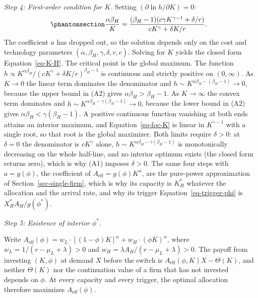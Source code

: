 \documentclass[
  11pt,
  letterpaper,
]{scrartcl}
\begin{document}
\emph{Step 4: First-order condition for \(K\).} Setting
\((\partial \ln h / \partial K) = 0\):
\begin{equation}\protect\phantomsection\label{eq-foc-K}{
\frac{\alpha \beta_H}{K} = \frac{(\beta_H - 1)(c\gamma K^{\gamma - 1} + \delta / r)}{cK^\gamma + \delta K / r}.
}\end{equation} The coefficient \(a\) has dropped out, so the solution
depends only on the cost and technology parameters
\((\alpha, \beta_H, \gamma, \delta, r, c)\). Solving for \(K\) yields
the closed form Equation~\ref{eq-K-H}. The critical point is the global
maximum. The function
\(h \propto K^{\alpha\beta_H} / (cK^\gamma + \delta K/r)^{\beta_H - 1}\)
is continuous and strictly positive on \((0, \infty)\). As \(K \to 0\)
the linear term dominates the denominator and
\(h \sim K^{\alpha\beta_H - (\beta_H - 1)} \to 0\), because the upper
bound in (A2) gives \(\alpha\beta_H > \beta_H - 1\). As \(K \to \infty\)
the convex term dominates and
\(h \sim K^{\alpha\beta_H - \gamma(\beta_H - 1)} \to 0\), because the
lower bound in (A2) gives \(\alpha\beta_H < \gamma(\beta_H - 1)\). A
positive continuous function vanishing at both ends attains an interior
maximum, and Equation~\ref{eq-foc-K} is linear in \(K^{\gamma - 1}\)
with a single root, so that root is the global maximizer. Both limits
require \(\delta > 0\): at \(\delta = 0\) the denominator is
\(cK^\gamma\) alone, \(h \sim K^{\alpha\beta_H - \gamma(\beta_H - 1)}\)
is monotonically decreasing on the whole half-line, and no interior
optimum exists (the closed form returns zero), which is why (A1) imposes
\(\delta > 0\). The same four steps with \(a = g(\phi)\), the
coefficient of \(A_{\text{eff}} = g(\phi) K^\alpha\), are the pure-power
approximation of Section~\ref{sec-single-firm}, which is why its
capacity is \(K_H^*\) whatever the allocation and the arrival rate, and
why its trigger Equation~\ref{eq-trigger-phi} is
\(X_H^* A_H / g(\phi^*)\).

\emph{Step 5: Existence of interior \(\phi^*\).}

Write
\(A_{\text{eff}}(\phi) = w_L \cdot [(1-\phi)K]^\alpha + w_H \cdot (\phi K)^\alpha\),
where \(w_L = 1/(r - \mu_L + \lambda) > 0\) and
\(w_H = \lambda A_H / (r - \mu_L + \lambda) > 0\). The payoff from
investing \((K, \phi)\) at demand \(X\) before the switch is
\(A_{\text{eff}}(\phi, K) X - \Theta(K)\), and neither \(\Theta(K)\) nor
the continuation value of a firm that has not invested depends on
\(\phi\). At every capacity and every trigger, the optimal allocation
therefore maximizes \(A_{\text{eff}}(\phi)\).
\end{document}
